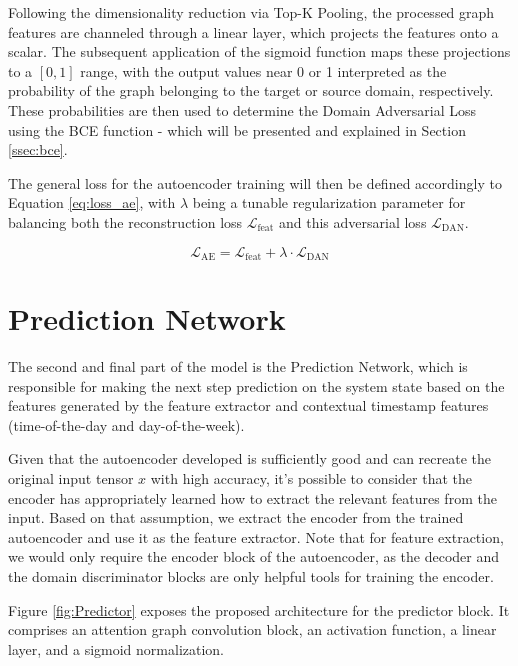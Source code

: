 Following the dimensionality reduction via Top-K Pooling, the processed graph features are channeled through a linear layer, which projects the features onto a scalar. The subsequent application of the sigmoid function maps these projections to a $[0, 1]$ range, with the output values near 0 or 1 interpreted as the probability of the graph belonging to the target or source domain, respectively. These probabilities are then used to determine the Domain Adversarial Loss using the \gls{BCE} function - which will be presented and explained in Section \ref{ssec:bce}.

The general loss for the autoencoder training will then be defined accordingly to Equation \ref{eq:loss_ae}, with $\lambda$ being a tunable regularization parameter for balancing both the reconstruction loss $\mathcal{L}_{\text{feat}}$ and this adversarial loss $\mathcal{L}_{\text{DAN}}$.

\begin{equation} \label{eq:loss_ae}
	\mathcal{L}_{\text{AE}} = \mathcal{L}_{\text{feat}} + \lambda \cdot \mathcal{L}_{\text{DAN}}
\end{equation}


\section{Prediction Network} \label{sec:pred}

The second and final part of the model is the Prediction Network, which is responsible for making the next step prediction on the system state based on the features generated by the feature extractor and contextual timestamp features (time-of-the-day and day-of-the-week).


Given that the autoencoder developed is sufficiently good and can recreate the original input tensor $x$ with high accuracy, it's possible to consider that the encoder has appropriately learned how to extract the relevant features from the input. Based on that assumption, we extract the encoder from the trained autoencoder and use it as the feature extractor. Note that for feature extraction, we would only require the encoder block of the autoencoder, as the decoder and the domain discriminator blocks are only helpful tools for training the encoder.

Figure \ref{fig:Predictor} exposes the proposed architecture for the predictor block. It comprises an attention graph convolution block, an activation function, a linear layer, and a sigmoid normalization.

